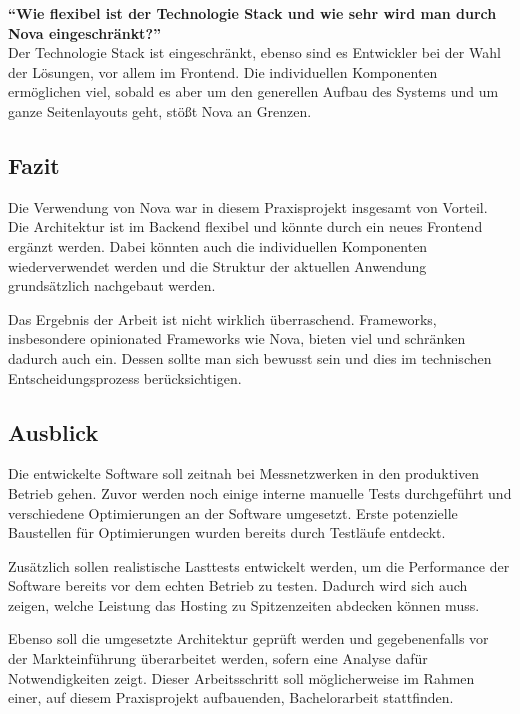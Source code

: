 \textbf{\enquote{Wie flexibel ist der Technologie Stack und wie sehr wird man durch Nova eingeschränkt?}}\\
Der Technologie Stack ist eingeschränkt, ebenso sind es Entwickler bei der Wahl der Lösungen, vor allem im Frontend.
Die individuellen Komponenten ermöglichen viel, sobald es aber um den generellen Aufbau des Systems und um ganze Seitenlayouts geht, stößt Nova an Grenzen.

\subsection{Fazit}
Die Verwendung von Nova war in diesem Praxisprojekt insgesamt von Vorteil.
Die Architektur ist im Backend flexibel und könnte durch ein neues Frontend ergänzt werden.
Dabei könnten auch die individuellen Komponenten wiederverwendet werden und die Struktur der aktuellen Anwendung grundsätzlich nachgebaut werden.

Das Ergebnis der Arbeit ist nicht wirklich überraschend.
Frameworks, insbesondere opinionated Frameworks wie Nova, bieten viel und schränken dadurch auch ein.
Dessen sollte man sich bewusst sein und dies im technischen Entscheidungsprozess berücksichtigen.

\subsection{Ausblick}
Die entwickelte Software soll zeitnah bei Messnetzwerken in den produktiven Betrieb gehen.
Zuvor werden noch einige interne manuelle Tests durchgeführt und verschiedene Optimierungen an der Software umgesetzt.
Erste potenzielle Baustellen für Optimierungen wurden bereits durch Testläufe entdeckt.

Zusätzlich sollen realistische Lasttests entwickelt werden, um die Performance der Software bereits vor dem echten Betrieb zu testen.
Dadurch wird sich auch zeigen, welche Leistung das Hosting zu Spitzenzeiten abdecken können muss.

Ebenso soll die umgesetzte Architektur geprüft werden und gegebenenfalls vor der Markteinführung überarbeitet werden, sofern eine Analyse dafür Notwendigkeiten zeigt.
Dieser Arbeitsschritt soll möglicherweise im Rahmen einer, auf diesem Praxisprojekt aufbauenden, Bachelorarbeit stattfinden.
